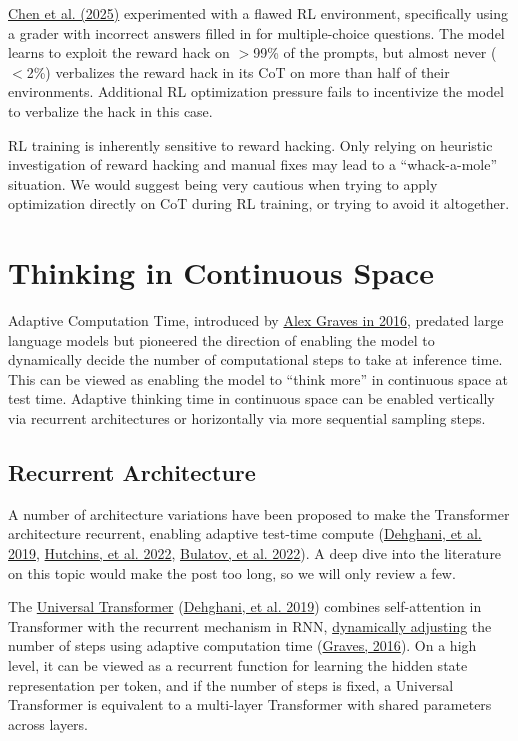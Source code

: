 \documentclass[12pt]{article}
\begin{document}
\href{https://assets.anthropic.com/m/71876fabef0f0ed4/original/reasoning_models_paper.pdf}{Chen et al. (2025)} experimented with a flawed RL environment, specifically using a grader with incorrect answers filled in for multiple-choice questions. The model learns to exploit the reward hack on $>$99\% of the prompts, but almost never ($<$2\%) verbalizes the reward hack in its CoT on more than half of their environments. Additional RL optimization pressure fails to incentivize the model to verbalize the hack in this case.

RL training is inherently sensitive to reward hacking. Only relying on heuristic investigation of reward hacking and manual fixes may lead to a ``whack-a-mole'' situation. We would suggest being very cautious when trying to apply optimization directly on CoT during RL training, or trying to avoid it altogether.

\section{Thinking in Continuous Space}

Adaptive Computation Time, introduced by \href{https://arxiv.org/abs/1603.08983}{Alex Graves in 2016}, predated large language models but pioneered the direction of enabling the model to dynamically decide the number of computational steps to take at inference time. This can be viewed as enabling the model to ``think more'' in continuous space at test time. Adaptive thinking time in continuous space can be enabled vertically via recurrent architectures or horizontally via more sequential sampling steps.

\subsection{Recurrent Architecture}

A number of architecture variations have been proposed to make the Transformer architecture recurrent, enabling adaptive test-time compute (\href{https://arxiv.org/abs/1807.03819}{Dehghani, et al. 2019}, \href{https://arxiv.org/abs/2203.07852}{Hutchins, et al. 2022}, \href{https://arxiv.org/abs/2207.06881}{Bulatov, et al. 2022}). A deep dive into the literature on this topic would make the post too long, so we will only review a few.

The \href{https://lilianweng.github.io/posts/2020-04-07-the-transformer-family/#make-it-recurrent-universal-transformer}{Universal Transformer} (\href{https://arxiv.org/abs/1807.03819}{Dehghani, et al. 2019}) combines self-attention in Transformer with the recurrent mechanism in RNN, \href{https://lilianweng.github.io/posts/2023-01-27-the-transformer-family-v2/#adaptive-modeling}{dynamically adjusting} the number of steps using adaptive computation time (\href{https://arxiv.org/abs/1603.08983}{Graves, 2016}). On a high level, it can be viewed as a recurrent function for learning the hidden state representation per token, and if the number of steps is fixed, a Universal Transformer is equivalent to a multi-layer Transformer with shared parameters across layers.
\end{document}
